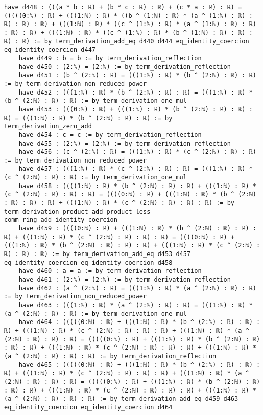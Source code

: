 \documentclass{article}
\begin{document}
\begin{tcolorbox}[colback=white!10, width=\linewidth]
\begin{lstlisting}[language=Lean4]
    have d448 : (((a * b : ℝ) + (b * c : ℝ) : ℝ) + (c * a : ℝ) : ℝ) = (((((0:ℕ) : ℝ) + (((1:ℕ) : ℝ) * ((b ^ (1:ℕ) : ℝ) * (a ^ (1:ℕ) : ℝ) : ℝ) : ℝ) : ℝ) + (((1:ℕ) : ℝ) * ((c ^ (1:ℕ) : ℝ) * (a ^ (1:ℕ) : ℝ) : ℝ) : ℝ) : ℝ) + (((1:ℕ) : ℝ) * ((c ^ (1:ℕ) : ℝ) * (b ^ (1:ℕ) : ℝ) : ℝ) : ℝ) : ℝ) := by term_derivation_add_eq d440 d444 eq_identity_coercion eq_identity_coercion d447
    have d449 : b = b := by term_derivation_reflection
    have d450 : (2:ℕ) = (2:ℕ) := by term_derivation_reflection
    have d451 : (b ^ (2:ℕ) : ℝ) = (((1:ℕ) : ℝ) * (b ^ (2:ℕ) : ℝ) : ℝ) := by term_derivation_non_reduced_power
    have d452 : (((1:ℕ) : ℝ) * (b ^ (2:ℕ) : ℝ) : ℝ) = (((1:ℕ) : ℝ) * (b ^ (2:ℕ) : ℝ) : ℝ) := by term_derivation_one_mul
    have d453 : (((0:ℕ) : ℝ) + (((1:ℕ) : ℝ) * (b ^ (2:ℕ) : ℝ) : ℝ) : ℝ) = (((1:ℕ) : ℝ) * (b ^ (2:ℕ) : ℝ) : ℝ) := by term_derivation_zero_add
    have d454 : c = c := by term_derivation_reflection
    have d455 : (2:ℕ) = (2:ℕ) := by term_derivation_reflection
    have d456 : (c ^ (2:ℕ) : ℝ) = (((1:ℕ) : ℝ) * (c ^ (2:ℕ) : ℝ) : ℝ) := by term_derivation_non_reduced_power
    have d457 : (((1:ℕ) : ℝ) * (c ^ (2:ℕ) : ℝ) : ℝ) = (((1:ℕ) : ℝ) * (c ^ (2:ℕ) : ℝ) : ℝ) := by term_derivation_one_mul
    have d458 : ((((1:ℕ) : ℝ) * (b ^ (2:ℕ) : ℝ) : ℝ) + (((1:ℕ) : ℝ) * (c ^ (2:ℕ) : ℝ) : ℝ) : ℝ) = ((((0:ℕ) : ℝ) + (((1:ℕ) : ℝ) * (b ^ (2:ℕ) : ℝ) : ℝ) : ℝ) + (((1:ℕ) : ℝ) * (c ^ (2:ℕ) : ℝ) : ℝ) : ℝ) := by term_derivation_product_add_product_less comm_ring_add_identity_coercion
    have d459 : ((((0:ℕ) : ℝ) + (((1:ℕ) : ℝ) * (b ^ (2:ℕ) : ℝ) : ℝ) : ℝ) + (((1:ℕ) : ℝ) * (c ^ (2:ℕ) : ℝ) : ℝ) : ℝ) = ((((0:ℕ) : ℝ) + (((1:ℕ) : ℝ) * (b ^ (2:ℕ) : ℝ) : ℝ) : ℝ) + (((1:ℕ) : ℝ) * (c ^ (2:ℕ) : ℝ) : ℝ) : ℝ) := by term_derivation_add_eq d453 d457 eq_identity_coercion eq_identity_coercion d458
    have d460 : a = a := by term_derivation_reflection
    have d461 : (2:ℕ) = (2:ℕ) := by term_derivation_reflection
    have d462 : (a ^ (2:ℕ) : ℝ) = (((1:ℕ) : ℝ) * (a ^ (2:ℕ) : ℝ) : ℝ) := by term_derivation_non_reduced_power
    have d463 : (((1:ℕ) : ℝ) * (a ^ (2:ℕ) : ℝ) : ℝ) = (((1:ℕ) : ℝ) * (a ^ (2:ℕ) : ℝ) : ℝ) := by term_derivation_one_mul
    have d464 : (((((0:ℕ) : ℝ) + (((1:ℕ) : ℝ) * (b ^ (2:ℕ) : ℝ) : ℝ) : ℝ) + (((1:ℕ) : ℝ) * (c ^ (2:ℕ) : ℝ) : ℝ) : ℝ) + (((1:ℕ) : ℝ) * (a ^ (2:ℕ) : ℝ) : ℝ) : ℝ) = (((((0:ℕ) : ℝ) + (((1:ℕ) : ℝ) * (b ^ (2:ℕ) : ℝ) : ℝ) : ℝ) + (((1:ℕ) : ℝ) * (c ^ (2:ℕ) : ℝ) : ℝ) : ℝ) + (((1:ℕ) : ℝ) * (a ^ (2:ℕ) : ℝ) : ℝ) : ℝ) := by term_derivation_reflection
    have d465 : (((((0:ℕ) : ℝ) + (((1:ℕ) : ℝ) * (b ^ (2:ℕ) : ℝ) : ℝ) : ℝ) + (((1:ℕ) : ℝ) * (c ^ (2:ℕ) : ℝ) : ℝ) : ℝ) + (((1:ℕ) : ℝ) * (a ^ (2:ℕ) : ℝ) : ℝ) : ℝ) = (((((0:ℕ) : ℝ) + (((1:ℕ) : ℝ) * (b ^ (2:ℕ) : ℝ) : ℝ) : ℝ) + (((1:ℕ) : ℝ) * (c ^ (2:ℕ) : ℝ) : ℝ) : ℝ) + (((1:ℕ) : ℝ) * (a ^ (2:ℕ) : ℝ) : ℝ) : ℝ) := by term_derivation_add_eq d459 d463 eq_identity_coercion eq_identity_coercion d464

\end{lstlisting}
\end{tcolorbox}
\end{document}
